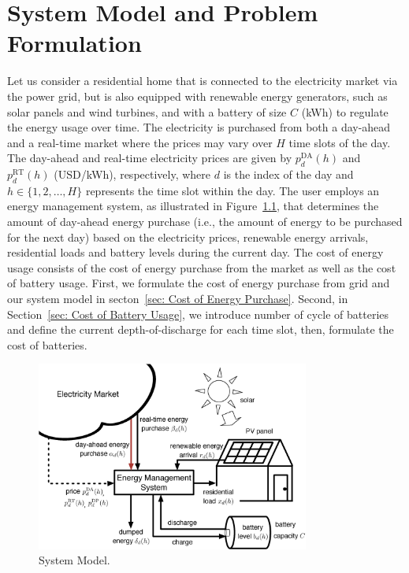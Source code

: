 \chapter{System Model and Problem Formulation}\label{cha: System Model and Problem Formulation}

Let us consider a residential home that is connected to the electricity market via the power grid, but is also equipped with renewable energy generators, such as solar panels and wind turbines, and with a battery of size $C$ (kWh) to regulate the energy usage over time. The electricity is purchased from both a day-ahead and a real-time market where the prices may vary over $H$ time slots of the day. The day-ahead and real-time electricity prices are given by $p_d^{\text{DA}}(h)$ and $p_d^{\text{RT}}(h)$ (USD/kWh), respectively, where $d$ is the index of the day and $h\in\{1,2,\ldots, H\}$ represents the time slot within the day. The user employs an energy management system, as illustrated in Figure~\ref{fig: system model}, that determines the amount of day-ahead energy purchase (i.e., the amount of energy to be purchased for the next day) based on the electricity prices, renewable energy arrivals, residential loads and battery levels during the current day. The cost of energy usage consists of the cost of energy purchase from the market as well as the cost of battery usage. First, we formulate the cost of energy purchase  from grid and our system model in secton~\ref{sec: Cost of Energy Purchase}. Second, in Section~\ref{sec: Cost of Battery Usage}, we introduce number of cycle of batteries and define the current depth-of-discharge for each time slot, then, formulate the cost of batteries.

\begin{figure}[ht]
  \centering
  \includegraphics[width=0.8\textwidth]{fig/model.eps}
  \caption{System Model.}
  \label{fig: system model}
\vspace{-.3cm}
\end{figure}

